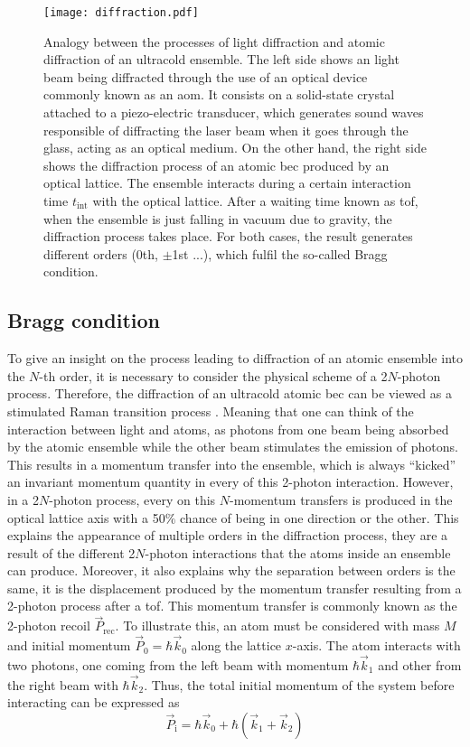 \begin{figure}[!htbp]\centering
	\texttt{[image: diffraction.pdf]}
	\caption[Analogy between the processes of light diffraction and atomic diffraction of an ultracold ensemble]{Analogy between the processes of light diffraction and atomic diffraction of an ultracold ensemble. The left side shows an light beam being diffracted through the use of an optical device commonly known as an \Acf{aom}. It consists on a solid-state crystal attached to a piezo-electric transducer, which generates sound waves responsible of diffracting the laser beam when it goes through the glass, acting as an optical medium. On the other hand, the right side shows the diffraction process of an atomic \ac{bec} produced by an optical lattice. The ensemble interacts during a certain interaction time $t_{\text{int}}$ with the optical lattice. After a waiting time known as \Acf{tof}, when the ensemble is just falling in vacuum due to gravity, the diffraction process takes place. For both cases, the result generates different orders (0th, $\pm$1st ...), which fulfil the so-called Bragg condition.}\label{fig:diffraction}
\end{figure}


\subsection{Bragg condition}\label{subsec:Bragg_condition}

To give an insight on the process leading to diffraction of an atomic ensemble into the $N$-th order, it is necessary to consider the physical scheme of a 2$N$-photon process. Therefore, the diffraction of an ultracold atomic \ac{bec} can be viewed as a stimulated Raman transition process \cite{Kozuma1999}. Meaning that one can think of the interaction between light and atoms, as photons from one beam being absorbed by the atomic ensemble while the other beam stimulates the emission of photons. This results in a momentum transfer into the ensemble, which is always ``kicked'' an invariant momentum quantity in every of this 2-photon interaction. However, in a 2$N$-photon process, every on this $N$-momentum transfers is produced in the optical lattice axis with a 50$\%$ chance of being in one direction or the other. This explains the appearance of multiple orders in the diffraction process, they are a result of the different 2$N$-photon interactions that the atoms inside an ensemble can produce. Moreover, it also explains why the separation between orders is the same, it is the displacement produced by the momentum transfer resulting from a 2-photon process after a \ac{tof}. This momentum transfer is commonly known as the 2-photon recoil $\vec{P}_\text{rec}$. To illustrate this, an atom must be considered with mass $M$ and initial momentum $\vec{P}_0 = \hbar \vec{k}_0$ along the lattice $x$-axis. The atom interacts with two photons, one coming from the left beam with momentum $\hbar \vec{k}_1$ and other from the right beam with $\hbar \vec{k}_2$. Thus, the total initial momentum of the system before interacting can be expressed as
\begin{equation}
	\vec{P}_\text{i} = \hbar \vec{k}_0 + \hbar (\vec{k}_1 + \vec{k}_2)
\end{equation}

